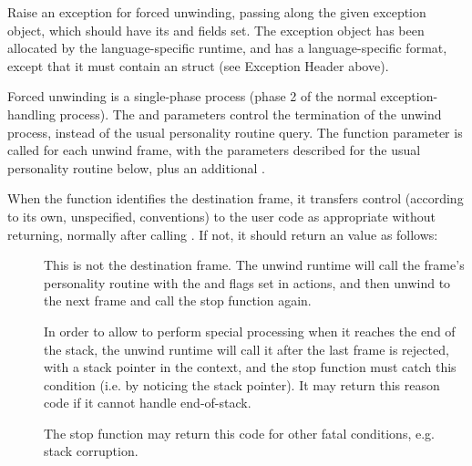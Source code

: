 \begin{sloppypar}
Raise an exception for forced unwinding, passing along the given
exception object, which should have its  and
 fields set. The exception object has been allocated
by the language-specific runtime, and has a language-specific format,
except that it must contain an  struct (see Exception
Header above).
\end{sloppypar}

Forced unwinding is a single-phase process (phase 2 of the normal
exception-handling process). The  and
 parameters control the termination of the
unwind process, instead of the usual personality routine query. The
 function parameter is called for each unwind frame, with
the parameters described for the usual personality routine below, plus
an additional .

When the  function identifies the destination frame, it
transfers control (according to its own, unspecified, conventions)
to the user code as appropriate without returning, normally after
calling . If not, it should return an
 value as follows:

\begin{description}
\item[]
     This is not the destination frame. The unwind
     runtime will call the frame's personality routine with the
      and  flags set in actions,
     and then unwind to the next frame and call the stop function again.

\item[] In order to allow 
     to perform special processing when it reaches the end of the stack,
     the unwind runtime will call it after the last frame is rejected,
     with a  stack pointer in the context, and the stop function must
     catch this condition (i.e. by noticing the  stack pointer).
     It may return this reason code if it cannot handle end-of-stack.

\item[] The stop function may return this code
     for other fatal conditions, e.g. stack corruption.
\end{description}

